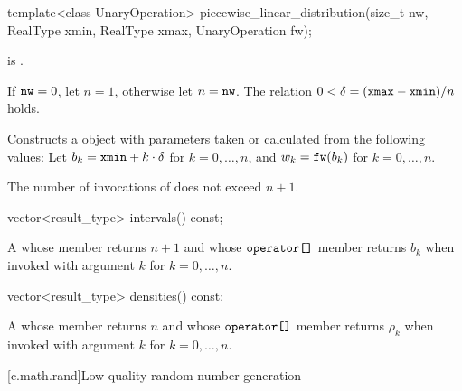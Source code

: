 %
\begin{itemdecl}
template<class UnaryOperation>
 piecewise_linear_distribution(size_t nw, RealType xmin, RealType xmax, UnaryOperation fw);
\end{itemdecl}

\begin{itemdescr}
\pnum
\mandates
{} is .

\pnum
\expects
 If $\texttt{\protect nw} = 0$, let $n = 1$, otherwise let $n = \texttt{\protect nw}$.
 The relation $0 < \delta = (\texttt{\protect xmax} - \texttt{\protect xmin}) / n$
 holds.

\pnum
\effects
Constructs a  object
 with parameters taken or calculated
 from the following values:
 Let $b_k = \texttt{\protect xmin} + k \cdot \delta$ for $k = 0, \dotsc, n$,
 and $w_k = \texttt{\protect fw}(b_k)$ for $k = 0, \dotsc, n$.

\pnum
\complexity
The number of invocations of  does not exceed $n+1$.
\end{itemdescr}

%
\begin{itemdecl}
vector<result_type> intervals() const;
\end{itemdecl}

\begin{itemdescr}
\pnum
\returns
A 
 whose  member returns $n + 1$
 and whose $ \texttt{\protect operator[]} $ member returns $b_k$
 when invoked with argument $k$ for $k = 0, \dotsc, n$.
\end{itemdescr}

%
\begin{itemdecl}
vector<result_type> densities() const;
\end{itemdecl}

\begin{itemdescr}
\pnum
\returns
A 
 whose  member returns $n$
 and whose $ \texttt{\protect operator[]} $ member returns $\rho_k$
 when invoked with argument $k$ for $k = 0, \dotsc, n$.
\end{itemdescr}%
%
%
%
%

[c.math.rand]{Low-quality random number generation}

